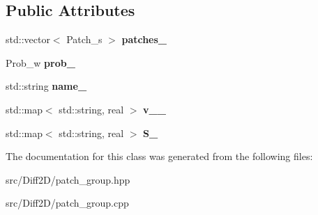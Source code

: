 \subsection*{Public Attributes}
\begin{DoxyCompactItemize}
\item 
\hypertarget{classPatch__Group_a637b27a0562076f78bf9b0698ac3609e}{std\-::vector$<$ Patch\-\_\-s $>$ {\bfseries patches\-\_\-}}\label{classPatch__Group_a637b27a0562076f78bf9b0698ac3609e}

\item 
\hypertarget{classPatch__Group_ac8d91a179d394f1d3d355d82ceb2dd2e}{Prob\-\_\-w {\bfseries prob\-\_\-}}\label{classPatch__Group_ac8d91a179d394f1d3d355d82ceb2dd2e}

\item 
\hypertarget{classPatch__Group_ac28afa5068ea65b91ce4d708f63c5a3a}{std\-::string {\bfseries name\-\_\-}}\label{classPatch__Group_ac28afa5068ea65b91ce4d708f63c5a3a}

\item 
\hypertarget{classPatch__Group_ae080e43ddd30ced473794b12a1cb3ccf}{std\-::map$<$ std\-::string, real $>$ {\bfseries v\-\_\-\_\-}}\label{classPatch__Group_ae080e43ddd30ced473794b12a1cb3ccf}

\item 
\hypertarget{classPatch__Group_aaad946bd88382b1e2e30cd1278632ace}{std\-::map$<$ std\-::string, real $>$ {\bfseries S\-\_\-}}\label{classPatch__Group_aaad946bd88382b1e2e30cd1278632ace}

\end{DoxyCompactItemize}


The documentation for this class was generated from the following files\-:\begin{DoxyCompactItemize}
\item 
src/\-Diff2\-D/patch\-\_\-group.\-hpp\item 
src/\-Diff2\-D/patch\-\_\-group.\-cpp\end{DoxyCompactItemize}
